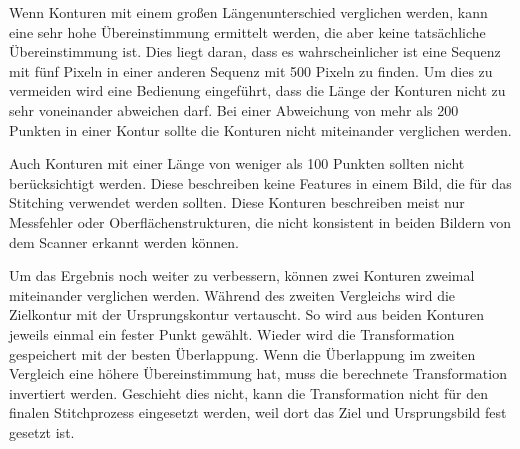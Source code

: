 Wenn Konturen mit einem großen Längenunterschied verglichen werden, 
kann eine sehr hohe Übereinstimmung ermittelt werden, die aber keine 
tatsächliche Übereinstimmung ist. Dies liegt daran, dass es wahrscheinlicher ist 
eine Sequenz mit fünf Pixeln in einer anderen Sequenz mit 500 Pixeln zu finden.  
Um dies zu vermeiden wird eine Bedienung eingeführt, dass die Länge
der Konturen nicht zu sehr voneinander abweichen darf. Bei einer Abweichung von mehr als
200 Punkten in einer Kontur sollte die Konturen nicht miteinander verglichen werden.

Auch Konturen mit einer Länge von weniger als 100 Punkten sollten nicht berücksichtigt 
werden. Diese beschreiben keine Features in einem Bild, die für das Stitching verwendet 
werden sollten. Diese Konturen beschreiben meist nur Messfehler oder 
Oberflächenstrukturen, die nicht konsistent in beiden Bildern von dem Scanner erkannt 
werden können.

Um das Ergebnis noch weiter zu verbessern, können zwei Konturen zweimal miteinander 
verglichen werden. Während des zweiten Vergleichs wird die Zielkontur mit der 
Ursprungskontur vertauscht. So wird aus beiden Konturen jeweils einmal ein fester 
Punkt gewählt. Wieder wird die Transformation gespeichert mit der besten Überlappung.
Wenn die Überlappung im zweiten Vergleich eine höhere Übereinstimmung hat, muss die 
berechnete Transformation invertiert werden. Geschieht dies nicht, kann die 
Transformation nicht für den finalen Stitchprozess eingesetzt werden, weil dort 
das Ziel und Ursprungsbild fest gesetzt ist.

